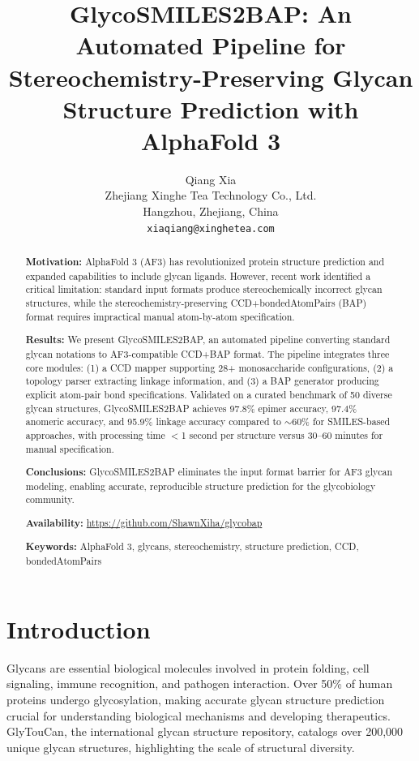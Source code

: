\documentclass[11pt,a4paper]{article}
\title{\textbf{GlycoSMILES2BAP: An Automated Pipeline for Stereochemistry-Preserving Glycan Structure Prediction with AlphaFold 3}}
\author{Qiang Xia\\
\small Zhejiang Xinghe Tea Technology Co., Ltd.\\
\small Hangzhou, Zhejiang, China\\
\small \texttt{xiaqiang@xinghetea.com}}
\date{}
\begin{document}
\maketitle

\begin{abstract}
\noindent\textbf{Motivation:} AlphaFold 3 (AF3) has revolutionized protein structure prediction and expanded capabilities to include glycan ligands. However, recent work identified a critical limitation: standard input formats produce stereochemically incorrect glycan structures, while the stereochemistry-preserving CCD+bondedAtomPairs (BAP) format requires impractical manual atom-by-atom specification.

\noindent\textbf{Results:} We present GlycoSMILES2BAP, an automated pipeline converting standard glycan notations to AF3-compatible CCD+BAP format. The pipeline integrates three core modules: (1) a CCD mapper supporting 28+ monosaccharide configurations, (2) a topology parser extracting linkage information, and (3) a BAP generator producing explicit atom-pair bond specifications. Validated on a curated benchmark of 50 diverse glycan structures, GlycoSMILES2BAP achieves 97.8\% epimer accuracy, 97.4\% anomeric accuracy, and 95.9\% linkage accuracy compared to ${\sim}60$\% for SMILES-based approaches, with processing time $<$1 second per structure versus 30--60 minutes for manual specification.

\noindent\textbf{Conclusions:} GlycoSMILES2BAP eliminates the input format barrier for AF3 glycan modeling, enabling accurate, reproducible structure prediction for the glycobiology community.

\noindent\textbf{Availability:} \url{https://github.com/ShawnXiha/glycobap}

\noindent\textbf{Keywords:} AlphaFold 3, glycans, stereochemistry, structure prediction, CCD, bondedAtomPairs
\end{abstract}

\section{Introduction}

Glycans are essential biological molecules involved in protein folding, cell signaling, immune recognition, and pathogen interaction. Over 50\% of human proteins undergo glycosylation, making accurate glycan structure prediction crucial for understanding biological mechanisms and developing therapeutics. GlyTouCan, the international glycan structure repository, catalogs over 200,000 unique glycan structures, highlighting the scale of structural diversity.
\end{document}
